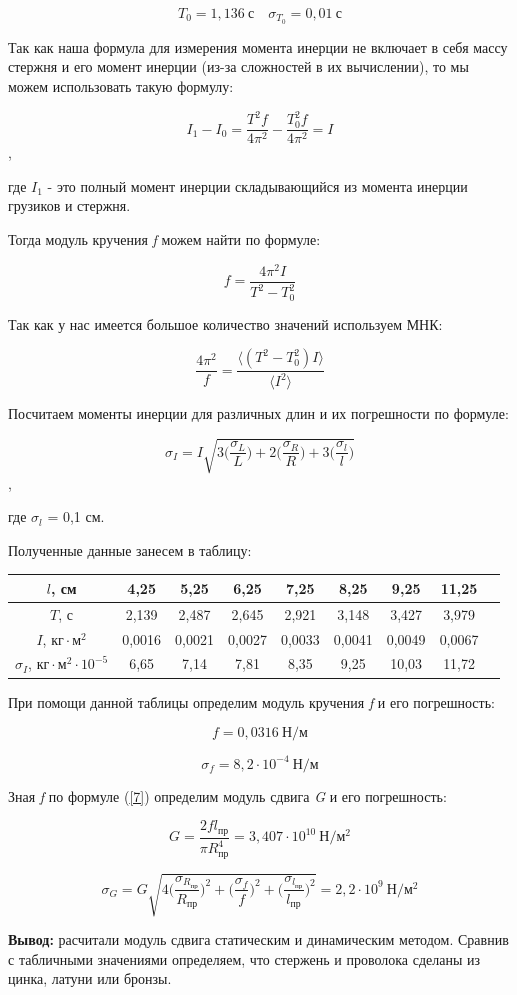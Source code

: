 \documentclass[12pt,a4paper]{article}
\begin{document}
\[T_0 = 1,136 \: \text{с} \quad \sigma_{T_0} = 0,01 \: \text{с}\]

Так как наша формула для измерения момента инерции не включает в себя массу стержня и его момент инерции (из-за сложностей в их вычислении), то мы можем использовать такую формулу:

\[I_1 - I_0 = \frac{T^2 f}{4\pi^2} - \frac{T_0^2 f}{4\pi^2} = I\],

где $\textit{I}_1$ - это полный момент инерции складывающийся из момента инерции грузиков и стержня.

Тогда модуль кручения \textit{f} можем найти по формуле:

\[f = \frac{4\pi^2I}{T^2 - T_0^2}\]

Так как у нас имеется большое количество значений используем МНК:

\[\frac{4\pi^2}{f} = \frac{\langle (T^2 - T_0^2) I\rangle}{\langle I^2\rangle}\]

Посчитаем моменты инерции для различных длин и их погрешности по формуле:

\[\sigma_I = I\sqrt{3\Big(\frac{\sigma_L}{L}\Big) + 2\Big(\frac{\sigma_R}{R}\Big) + 3\Big(\frac{\sigma_l}{l}\Big) }\],

где $\sigma_l$ = 0,1 см.

Полученные данные занесем в таблицу:

\vspace{0,5cm}

\begin{tabular}{|c|c|c|c|c|c|c|c|c|}
\hline
$l$, см & 4,25 & 5,25 & 6,25 & 7,25 & 8,25 & 9,25 & 11,25 \\
\hline
$T$, с & 2,139 & 2,487 & 2,645 & 2,921 & 3,148 & 3,427 & 3,979 \\
\hline
$I$, $\text{кг}\cdot\text{м}^2$ & 0,0016 & 0,0021 & 0,0027 & 0,0033 & 0,0041 & 0,0049 & 0,0067 \\
\hline
$\sigma_I$, $\text{кг}\cdot\text{м}^2\cdot 10^{-5}$ & 6,65 & 7,14 & 7,81 & 8,35 & 9,25 & 10,03 & 11,72 \\
\hline
\end{tabular}

\vspace{0,5cm} 

При помощи данной таблицы определим модуль кручения \textit{f} и его погрешность:

\[f = 0,0316\:\text{Н}/\text{м}\]

\[\sigma_f = 8,2\cdot10^{-4} \:\text{Н}/\text{м}\]

Зная \textit{f} по формуле (\ref{7}) определим модуль сдвига \textit{G} и его погрешность:

\[G = \frac{2fl_{\text{пр}}}{\pi R_{\text{пр}}^4} = 3,407\cdot 10^{10} \:\text{Н}/\text{м}^2\]

\[\sigma_G = G\sqrt{4\Big(\frac{\sigma_{R_{\text{пр}}}}{R_{\text{пр}}}\Big)^2 + \Big(\frac{\sigma_{f}}{f}\Big)^2 + \Big(\frac{\sigma_{l_{\text{пр}}}}{l_{\text{пр}}}\Big)^2} = 2,2\cdot 10^9 \:\text{Н}/\text{м}^2\]

\textbf{Вывод:} расчитали модуль сдвига статическим и динамическим методом. Сравнив с табличными значениями определяем, что стержень и проволока сделаны из цинка, латуни или бронзы.
\end{document}
